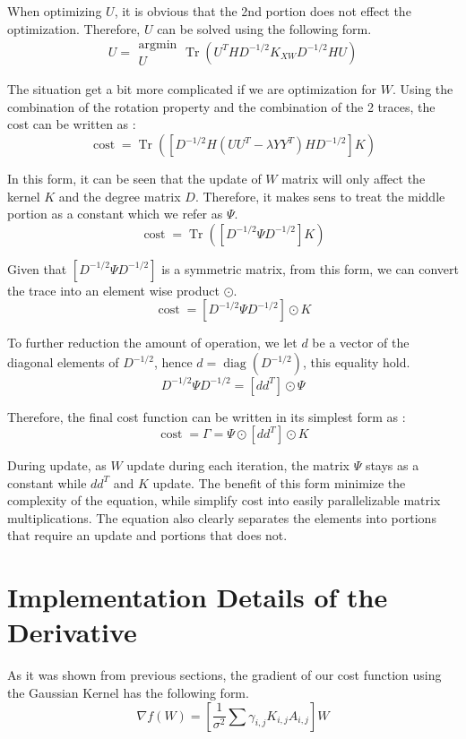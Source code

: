 \documentclass{article}
\newcommand{\tmop}[1]{\ensuremath{\operatorname{#1}}}
\begin{document}
When optimizing $U$, it is obvious that the 2nd portion does not effect the
optimization. Therefore, $U$ can be solved using the following form.
\[ U = \begin{array}{l}
     \tmop{argmin}\\
     U
   \end{array} \tmop{Tr} ( U^T H D^{- 1 / 2} K_{X W} D^{- 1 / 2} H U) \]


The situation get a bit more complicated if we are optimization for $W$. Using
the combination of the rotation property and the combination of the 2 traces,
the cost can be written as :
\[ \tmop{cost} = \tmop{Tr} ( [ D^{- 1 / 2} H ( U U^T - \lambda Y Y^T) H D^{-
   1 / 2}] K) \]


In this form, it can be seen that the update of $W$ matrix will only affect
the kernel $K$ and the degree matrix $D$. Therefore, it makes sens to treat
the middle portion as a constant which we refer as $\Psi$.
\[ \tmop{cost} = \tmop{Tr} ( [ D^{- 1 / 2} \Psi D^{- 1 / 2}] K) \]


Given that $[ D^{- 1 / 2} \Psi D^{- 1 / 2}]$ is a symmetric matrix, from this
form, we can convert the trace into an element wise product $\odot$.
\[ \tmop{cost} = [ D^{- 1 / 2} \Psi D^{- 1 / 2}] \odot K \]


To further reduction the amount of operation, we let $d$ be a vector of the
diagonal elements of $D^{- 1 / 2}$, hence $d = \tmop{diag} ( D^{- 1 / 2})$,
this equality hold.
\[ D^{- 1 / 2} \Psi D^{- 1 / 2} = [ d d^T] \odot \Psi \]


Therefore, the final cost function can be written in its simplest form as :
\[ \tmop{cost} = \Gamma = \Psi \odot [ d d^T] \odot K \]


During update, as $W$ update during each iteration, the matrix $\Psi$ stays as
a constant while $d d^T$ and $K$ update. The benefit of this form minimize the
complexity of the equation, while simplify cost into easily parallelizable
matrix multiplications. The equation also clearly separates the elements into
portions that require an update and portions that does not.



\section{Implementation Details of the Derivative}



As it was shown from previous sections, the gradient of our cost function
using the Gaussian Kernel has the following form.
\[ \nabla f ( W) = \left[ \frac{1}{\sigma^2} \sum \gamma_{i, j} K_{i, j} A_{i,
   j} \right] W \]
\end{document}
